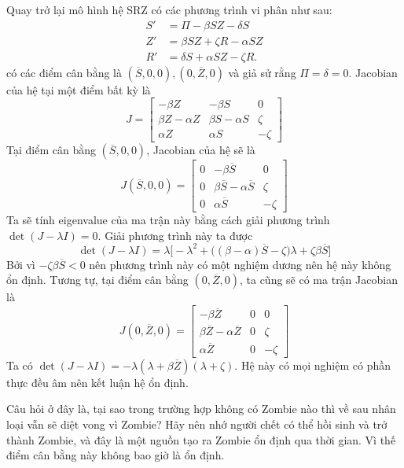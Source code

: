 \documentclass[12pt]{scrartcl}
\begin{document}
Quay trở lại mô hình hệ SRZ có các phương trình vi phân như sau:
\[
    \begin{aligned}
    S' &= \Pi - \beta S Z - \delta S \\
    Z' &= \beta S Z + \zeta R - \alpha SZ\\
    R' &= \delta S + \alpha SZ - \zeta R.
    \end{aligned}
\]
có các điểm cân bằng là $(\overline{S} ,0,0),(0,\overline{Z} ,0)$ và giả sử rằng $\Pi = \delta = 0$. Jacobian của hệ tại một điểm bất kỳ là 
\[  
    J = \begin{bmatrix}
    -\beta Z  & -\beta S & 0 \\
    \beta Z - \alpha Z & \beta S - \alpha S & \zeta \\
     \alpha Z& \alpha S & -\zeta
    \end{bmatrix}
\]
Tại điểm cân bằng $(\overline{S} ,0,0)$, Jacobian của hệ sẽ là 
\[
    J(\overline{S},0,0) = \begin{bmatrix}
    0 & -\beta \overline{S} & 0 \\
    0 & \beta\overline{S} - \alpha\overline{S} & \zeta \\
    0 & \alpha\overline{S} & -\zeta
    \end{bmatrix}
\]
Ta sẽ tính eigenvalue của ma trận này bằng cách giải phương trình $\det(J - \lambda I) = 0$. Giải phương trình này ta được 
\[
\det(J-\lambda I) =
\lambda \bigg[
-\lambda^2 +
\big( (\beta-\alpha)\overline{S} - \zeta \big)\lambda +
\zeta\beta\overline{S}
\bigg]
\]
Bởi vì $-\zeta\beta\overline{S} < 0$ nên phương trình này có một nghiệm dương nên hệ này không ổn định. Tương tự, tại điểm cân bằng $(0,\overline{Z},0)$, ta cũng sẽ có ma trận Jacobian là
\[
    J(0,\overline{Z},0) = \begin{bmatrix}
    -\beta \overline{Z} & 0 & 0 \\
    \beta \overline{Z}  -\alpha \overline{Z} &0 & \zeta \\
     \alpha \overline{Z} & 0 & -\zeta
    \end{bmatrix} 
\]
Ta có $\det(J-\lambda I) = -\lambda (\lambda+\beta\overline{Z}) (\lambda+\zeta)$. Hệ này có mọi nghiệm có phần thực đều âm nên kết luận hệ ổn định.

Câu hỏi ở đây là, tại sao trong trường hợp không có Zombie nào thì về sau nhân loại vẫn sẽ diệt vong vì Zombie? Hãy nên nhớ người chết có thể hồi sinh và trở thành Zombie, và đây là một nguồn tạo ra Zombie ổn định qua thời gian. Vì thế điểm cân bằng này không bao giờ là ổn định.
\end{document}
